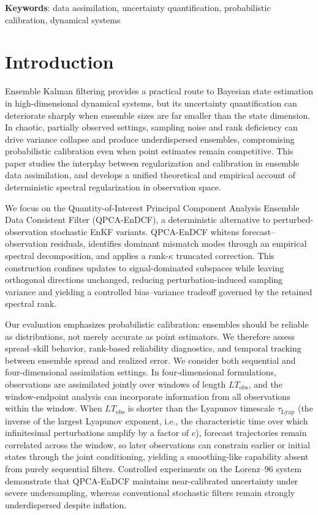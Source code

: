 \documentclass[11pt,a4paper]{article}
\begin{document}
\noindent\textbf{Keywords}: data assimilation, uncertainty quantification, probabilistic calibration, dynamical systems






\section{Introduction}

Ensemble Kalman filtering provides a practical route to Bayesian state estimation in high-dimensional dynamical systems, but its uncertainty quantification can deteriorate sharply when ensemble sizes are far smaller than the state dimension. In chaotic, partially observed settings, sampling noise and rank deficiency can drive variance collapse and produce underdispersed ensembles, compromising probabilistic calibration even when point estimates remain competitive. This paper studies the interplay between regularization and calibration in ensemble data assimilation, and develops a unified theoretical and empirical account of deterministic spectral regularization in observation space.

We focus on the Quantity-of-Interest Principal Component Analysis Ensemble Data Consistent Filter (QPCA-EnDCF), a deterministic alternative to perturbed-observation stochastic EnKF variants. QPCA-EnDCF whitens forecast--observation residuals, identifies dominant mismatch modes through an empirical spectral decomposition, and applies a rank-$\kappa$ truncated correction. This construction confines updates to signal-dominated subspaces while leaving orthogonal directions unchanged, reducing perturbation-induced sampling variance and yielding a controlled bias--variance tradeoff governed by the retained spectral rank.

Our evaluation emphasizes probabilistic calibration: ensembles should be reliable as distributions, not merely accurate as point estimators. We therefore assess spread--skill behavior, rank-based reliability diagnostics, and temporal tracking between ensemble spread and realized error. We consider both sequential and four-dimensional assimilation settings. In four-dimensional formulations, observations are assimilated jointly over windows of length $LT_{\mathrm{obs}}$, and the window-endpoint analysis can incorporate information from all observations within the window. When $LT_{\mathrm{obs}}$ is shorter than the Lyapunov timescale $\tau_{\mathrm{Lyap}}$ (the inverse of the largest Lyapunov exponent, i.e., the characteristic time over which infinitesimal perturbations amplify by a factor of $e$), forecast trajectories remain correlated across the window, so later observations can constrain earlier or initial states through the joint conditioning, yielding a smoothing-like capability absent from purely sequential filters. Controlled experiments on the Lorenz--96 system demonstrate that QPCA-EnDCF maintains near-calibrated uncertainty under severe undersampling, whereas conventional stochastic filters remain strongly underdispersed despite inflation.
\end{document}

